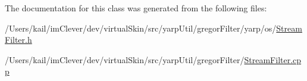 The documentation for this class was generated from the following files:\begin{DoxyCompactItemize}
\item 
/Users/kail/imClever/dev/virtualSkin/src/yarpUtil/gregorFilter/yarp/os/\hyperlink{_stream_filter_8h}{StreamFilter.h}\item 
/Users/kail/imClever/dev/virtualSkin/src/yarpUtil/gregorFilter/\hyperlink{_stream_filter_8cpp}{StreamFilter.cpp}\end{DoxyCompactItemize}
